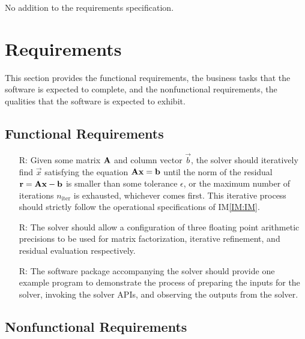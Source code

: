 \documentclass[12pt]{article}
\newcommand{\iref}[1]{IM\ref{#1}}
\newcounter{reqnum} %
\begin{document}
\noindent No addition to the requirements specification.

\section{Requirements}


This section provides the functional requirements, the business tasks that the
software is expected to complete, and the nonfunctional requirements, the
qualities that the software is expected to exhibit.

\subsection{Functional Requirements}

\noindent \begin{itemize}

\item[R\refstepcounter{reqnum}\thereqnum \label{R:Axb}:] Given some matrix
  \(\mathbf{A}\) and column vector \(\vec{b}\), the solver should iteratively find
  \(\vec{x}\) satisfying the equation \(\mathbf{A}\mathbf{x} = \mathbf{b}\) until the
  norm of the residual \(\mathbf{r} = \mathbf{A}\mathbf{x} - \mathbf{b}\) is smaller than
  some tolerance \(\epsilon\), or the maximum number of iterations
  \(n_\mathrm{iter}\) is exhausted, whichever comes first. This iterative
  process should strictly follow the operational specifications of \iref{IM:IM}.
\item[R\refstepcounter{reqnum}\thereqnum \label{R:MP}:] The solver should allow a
  configuration of three floating point arithmetic precisions to be used for
  matrix factorization, iterative refinement, and residual evaluation
  respectively.
\item[R\refstepcounter{reqnum}\thereqnum \label{R:ex}:] The software package
  accompanying the solver should provide one example program to demonstrate the
  process of preparing the inputs for the solver, invoking the solver APIs, and
  observing the outputs from the solver.

\end{itemize}


\subsection{Nonfunctional Requirements}
\end{document}
